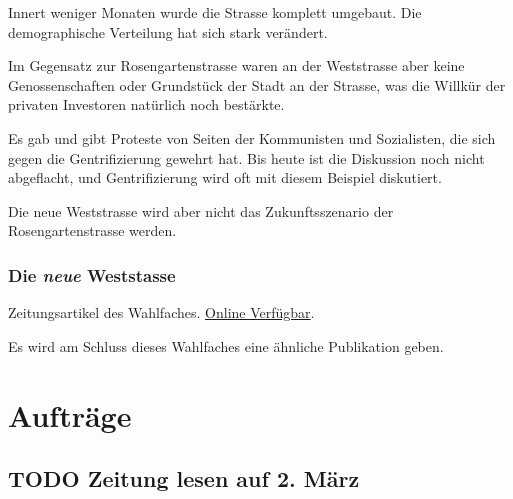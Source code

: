 \documentclass[11pt]{article}
\begin{document}
Innert weniger Monaten wurde die Strasse komplett umgebaut. Die
demographische Verteilung hat sich stark verändert.

Im Gegensatz zur Rosengartenstrasse waren an der Weststrasse aber keine
Genossenschaften oder Grundstück der Stadt an der Strasse, was die Willkür
der privaten Investoren natürlich noch bestärkte.

Es gab und gibt Proteste von Seiten der Kommunisten und Sozialisten, die
sich gegen die Gentrifizierung gewehrt hat. Bis heute ist die Diskussion
noch nicht abgeflacht, und Gentrifizierung wird oft mit diesem Beispiel
diskutiert.

Die neue Weststrasse wird aber nicht das Zukunftsszenario der
Rosengartenstrasse werden.

\subsubsection{Die \emph{neue} Weststasse}
\label{sec-2-1-3}

Zeitungsartikel des Wahlfaches. \href{http://www.soziologie.arch.ethz.ch/_DATA/90/FINAL_DieNeueWeststrasse_160517.pdf}{Online Verfügbar}.

Es wird am Schluss dieses Wahlfaches eine ähnliche Publikation geben.

\section{Aufträge}
\label{sec-3}

\subsection{{\bfseries\sffamily TODO} Zeitung lesen auf 2. März}
\label{sec-3-1}
\end{document}
